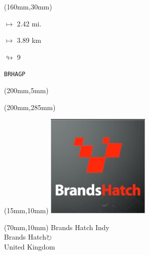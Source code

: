 \begin{textblock*}{40mm}(160mm,30mm)%
\Large
\par$\mapsto$ 2.42 mi.
\par$\mapsto$ 3.89 km
\par$\looparrowright$ 9
\par\hfill\tiny\tt BRHAGP\\
\end{textblock*}
\begin{textblock*}{20mm}(200mm,5mm)%
\fbox{\thepage}
\label{BRHAGP}
\end{textblock*}
\begin{textblock*}{20mm}(200mm,285mm)%
\fbox{\thepage}
\end{textblock*}

\null\newpage
\begin{textblock*}{50mm}(15mm,10mm)%
\includegraphics[width=50mm]{LG/2015-05-20_00074.png}
\end{textblock*}
\begin{textblock*}{130mm}(70mm,10mm)%
{\fontsize{20}{20}\selectfont Brands Hatch Indy\\}
{\fontsize{16}{16}\selectfont Brands Hatch\hfill \Large$\circlearrowright$\\}
{\fontsize{12}{12}\selectfont United Kingdom\\}
\end{textblock*}
